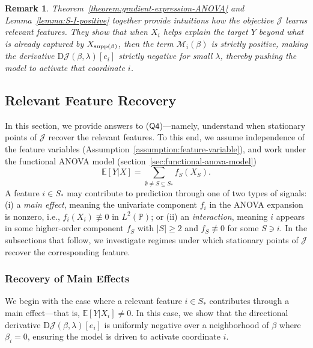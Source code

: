 \documentclass[sn-mathphys-num]{sn-jnl}%
\numberwithin{equation}{section}
\newcommand{\E}{\mathbb{E}}
\renewcommand{\P}{\mathbb{P}}
\newcommand{\supp}{\mathop{\rm supp}}
\theoremstyle{thmstyleone}%
\theoremstyle{thmstyletwo}%
\newtheorem{remark}{Remark}%
\theoremstyle{thmstylethree}%
\begin{document}

\vspace{.5em} 
\begin{remark}
\emph{
Theorem~\ref{theorem:gradient-expression-ANOVA} and Lemma~\ref{lemma:S-I-positive} together provide intuitions how the objective $\mathcal{J}$ learns relevant features. They show that when $X_i$ helps explain the target $Y$ beyond what is already captured by $X_{\supp(\beta)}$, then the term $\mathcal{M}_i(\beta)$ is strictly positive, making the derivative $\mathrm{D} \mathcal{J}(\beta, \lambda)[e_i]$ strictly negative for small $\lambda$, thereby pushing the model to activate that coordinate $i$.
}
\end{remark} 



\subsection{Relevant Feature Recovery} 
\label{sec:relevant-feature-recovery-at-stationary-points}
In this section, we provide answers to ($\mathsf{Q4}$)---namely, understand when stationary points of 
$\mathcal{J}$ recover the relevant features. To this end, we assume independence of the feature variables
(Assumption~\ref{assumption:feature-variable}),  and work under the functional ANOVA model 
(section~\ref{sec:functional-anova-model})
\begin{equation*}
\E[Y | X] = \sum_{\emptyset \neq S \subseteq S_*} f_S(X_S).
\end{equation*}
A feature $i \in S_*$ may contribute to prediction through one of two types of signals: 
(i) a \emph{main effect},  meaning the univariate component $f_{{i}}$ in the ANOVA expansion is nonzero, i.e., 
$f_{i}(X_i) \not\equiv 0$ in $L^2(\P)$; or (ii) an \emph{interaction}, meaning $i$ appears in some higher-order 
component $f_S$ with $|S| \ge 2$ and $f_S \not\equiv 0$ for some $S \ni i$. 
In the subsections that follow, we investigate regimes under which stationary points of $\mathcal{J}$ recover the corresponding feature.

\subsubsection{Recovery of Main Effects} 
We begin with the case where a relevant feature $i \in S_*$ contributes through a main effect---that is, $\E[Y | X_i] \ne 0$. In this case, we show that the directional derivative $\mathrm{D}\mathcal{J}(\beta, \lambda)[e_i]$ is uniformly negative over a neighborhood of $\beta$ where $\beta_i = 0$, ensuring the model is driven to activate coordinate $i$.
\vspace{.5em} 
\end{document}
